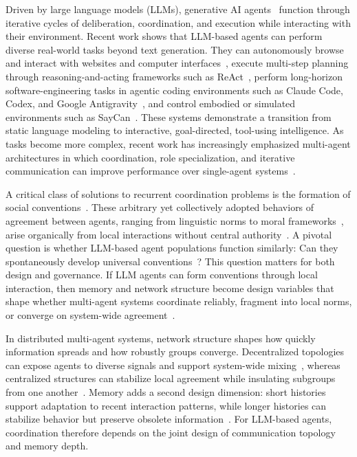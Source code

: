 \documentclass{article}
\begin{document}
Driven by large language models (LLMs), generative AI agents~\cite{wang2024survey} function through iterative cycles of deliberation, coordination, and execution while interacting with their environment. Recent work shows that LLM-based agents can perform diverse real-world tasks beyond text generation. They can autonomously browse and interact with websites and computer interfaces~\cite{zhou2023webarena,deng2023mind2web}, execute multi-step planning through reasoning-and-acting frameworks such as ReAct~\cite{yao2022react}, perform long-horizon software-engineering tasks in agentic coding environments such as Claude Code, Codex, and Google Antigravity~\cite{anthropic2025claudecode,openai2025codex,google2025antigravity}, and control embodied or simulated environments such as SayCan~\cite{ahn2022can}. These systems demonstrate a transition from static language modeling to interactive, goal-directed, tool-using intelligence. As tasks become more complex, recent work has increasingly emphasized multi-agent architectures in which coordination, role specialization, and iterative communication can improve performance over single-agent systems~\cite{li2023camel,wu2023autogen,bo2024copper,tran2025multi}.

A critical class of solutions to recurrent coordination problems is the formation of social conventions~\cite{lewis1969convention,young1993evolution,bicchieri2005grammar,gelfand2024norm}. These arbitrary yet collectively adopted behaviors of agreement between agents, ranging from linguistic norms to moral frameworks~\cite{lewis1969convention,baronchelli2018emergence}, arise organically from local interactions without central authority~\cite{steels1995self,baronchelli2006sharp,centola2015spontaneous,hayek2020constitution,sugden1989spontaneous}. A pivotal question is whether LLM-based agent populations function similarly: Can they spontaneously develop universal conventions~\cite{werfel2014designing,brinkmann2023machine,wu2023autogen}? This question matters for both design and governance. If LLM agents can form conventions through local interaction, then memory and network structure become design variables that shape whether multi-agent systems coordinate reliably, fragment into local norms, or converge on system-wide agreement~\cite{dafoe2021cooperative}. 

In distributed multi-agent systems, network structure shapes how quickly information spreads and how robustly groups converge. Decentralized topologies can expose agents to diverse signals and support system-wide mixing~\cite{olfati2007consensus,granovetter1973strength}, whereas centralized structures can stabilize local agreement while insulating subgroups from one another~\cite{zhang2018fully,centola2007complex}. Memory adds a second design dimension: short histories support adaptation to recent interaction patterns, while longer histories can stabilize behavior but preserve obsolete information~\cite{xiong2025memory,salama2025meminsight,liang2026learning}. For LLM-based agents, coordination therefore depends on the joint design of communication topology and memory depth.
\end{document}
